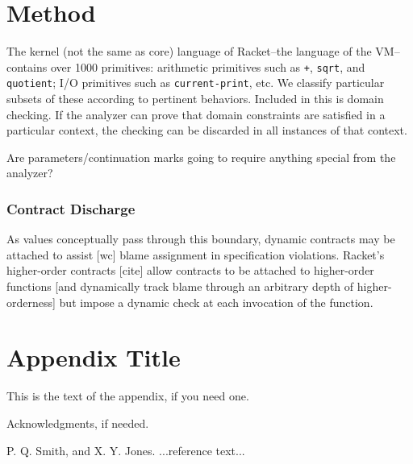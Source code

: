 \documentclass[preprint]{sigplanconf}
\begin{document}
\section{Method}

The kernel (not the same as core) language of Racket--the language of the VM--contains over 1000 primitives: arithmetic primitives such as \texttt{+}, \texttt{sqrt}, and \texttt{quotient}; I/O primitives such as \texttt{current-print}, etc. We classify particular subsets of these according to pertinent behaviors.
Included in this is domain checking.
If the analyzer can prove that domain constraints are satisfied in a particular context, the checking can be discarded in all instances of that context.

Are parameters/continuation marks going to require anything special from the analyzer?

\subsubsection{Contract Discharge}
As values conceptually pass through this boundary, dynamic contracts may be attached to assist [wc] blame assignment in specification violations.
Racket's higher-order contracts [cite] allow contracts to be attached to higher-order functions [and dynamically track blame through an arbitrary depth of higher-orderness] but impose a dynamic check at each invocation of the function. 
\appendix
\section{Appendix Title}

This is the text of the appendix, if you need one.

\acks

Acknowledgments, if needed.





\begin{thebibliography}{}
\softraggedright

P. Q. Smith, and X. Y. Jones. ...reference text...

\end{thebibliography}
\end{document}
